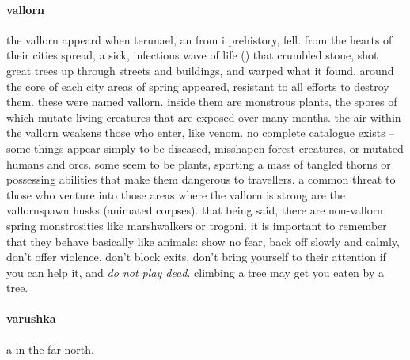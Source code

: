 \paragraph{vallorn} the vallorn appeard when terunael, an  from i prehistory, fell. from the hearts of their cities spread, a sick, infectious wave of life () that crumbled stone, shot great trees up through streets and buildings, and warped what it found. around the core of each city areas of spring appeared, resistant to all efforts to destroy them. these were named vallorn. inside them are monstrous plants, the spores of which mutate living creatures that are exposed over many months. the air within the vallorn weakens those who enter, like venom. no complete catalogue exists – some things appear simply to be diseased, misshapen forest creatures, or mutated humans and orcs. some seem to be plants, sporting a mass of tangled thorns or possessing abilities that make them dangerous to travellers. a common threat to those who venture into those areas where the vallorn is strong are the vallornspawn husks (animated corpses). that being said, there are non-vallorn spring monstrosities like marshwalkers or trogoni. it is important to remember that they behave basically like animals: show no fear, back off slowly and calmly, don't offer violence, don't block exits, don't bring yourself to their attention if you can help it, and \emph{do not play dead}. climbing a tree may get you eaten by a tree.
\paragraph{varushka} a  in the far north.
